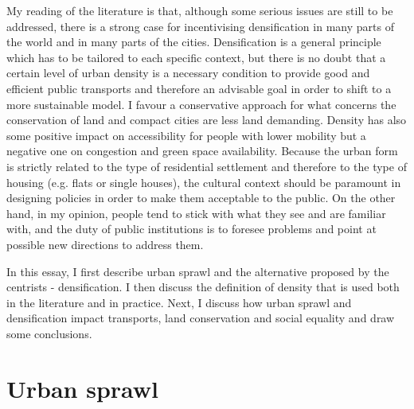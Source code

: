 \documentclass [a4paper,12pt]{article} %
\begin{document}
My reading of the literature is that, although some serious issues are still to be addressed, there is a strong case for incentivising densification in many parts of the world and in many parts of the cities. Densification is a general principle which has to be tailored to each specific context, but there is no doubt that a certain level of urban density is a necessary condition to provide good and efficient public transports and therefore an advisable goal in order to shift to a more sustainable model. I favour a conservative approach for what concerns the conservation of land and compact cities are less land demanding. Density has also some positive impact on accessibility for people with lower mobility but a negative one on congestion and green space availability. Because the urban form is strictly related to the type of residential settlement and therefore to the type of housing (e.g. flats or single houses), the cultural context should be paramount in designing policies in order to make them acceptable to the public. On the other hand, in my opinion, people tend to stick with what they see and are familiar with, and the duty of public institutions is to foresee problems and point at possible new directions to address them.

In this essay, I first describe urban sprawl and the alternative proposed by the centrists - densification. I then discuss the definition of density that is used both in the literature and in practice. Next, I discuss how urban sprawl and densification impact transports, land conservation and social equality and draw some conclusions. 

\section*{Urban sprawl}
\end{document}
